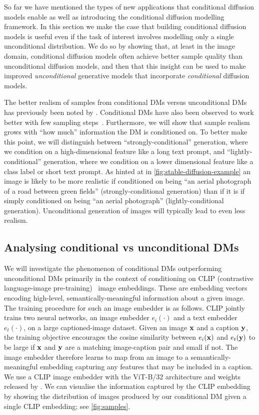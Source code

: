 So far we have mentioned the types of new applications that conditional diffusion models enable as well as introducing the conditional diffusion modelling framework. In this section we make the case that building conditional diffusion models is useful even if the task of interest involves modelling only a single unconditional distribution. We do so by showing that, at least in the image domain, conditional diffusion models often achieve better sample quality than unconditional diffusion models, and then that this insight can be used to make improved \textit{unconditional} generative models that incorporate \textit{conditional} diffusion models.

The better realism of samples from conditional DMs versus unconditional DMs has previously been noted by \citet{ho2022classifier,bao2022conditional,hu2022self}. Conditional DMs have also been observed to work better with few sampling steps~\citep{meng2022distillation}. Furthermore, we will show that sample realism grows with ``how much'' information the DM is conditioned on. To better make this point, we will distinguish between ``strongly-conditional'' generation, where we condition on a high-dimensional feature like a long text prompt, and ``lightly-conditional'' generation, where we condition on a lower dimensional feature like a class label or short text prompt.  As hinted at in \cref{fig:stable-diffusion-example} an image is likely to be more realistic if conditioned on being ``an aerial photograph of a road between green fields'' (strongly-conditional generation) than if it is if simply conditioned on being ``an aerial photograph'' (lightly-conditional generation). Unconditional generation of images will typically lead to even less realism.

\subsection{Analysing conditional vs unconditional DMs} \label{sec:2sdm-cond-vs-uncond-dgms}

We will investigate the phenomenon of conditional DMs outperforming unconditional DMs primarily in the context of conditioning on CLIP (contrastive language-image pre-training)~\citep{radford2021learning} image embeddings. These are embedding vectors encoding high-level, semantically-meaningful information about a given image. The training procedure for such an image embedder is as follows. CLIP jointly trains two neural networks, an image embedder $e_i(\cdot)$ and a text embedder $e_t(\cdot)$, on a large captioned-image dataset. Given an image ${\mathbf{x}}$ and a caption ${\mathbf{y}}$, the training objective encourages the cosine similarity between $e_i({\mathbf{x}})$ and $e_t({\mathbf{y}})$ to be large if ${\mathbf{x}}$ and ${\mathbf{y}}$ are a matching image-caption pair and small if not.
The image embedder therefore learns to map from an image to a semantically-meaningful embedding capturing any features that may be included in a caption. We use a CLIP image embedder with the ViT-B/32 architecture and weights released by \citet{radford2021learning}. We can visualise the information captured by the CLIP embedding by showing the distribution of images produced by our conditional DM given a single CLIP embedding; see \cref{fig:samples}.

